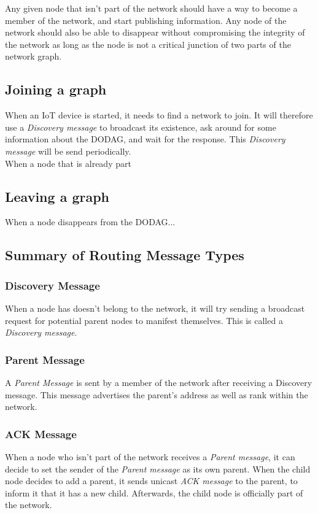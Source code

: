 \documentclass[a4paper,11pt]{article}
\begin{document}
Any given node that isn't part of the network should have a way to become a member of the network, and start publishing information. Any node of the network should also be able to disappear without compromising the integrity of the network as long as the node is not a critical junction of two parts of the network graph.

\subsection{Joining a graph}
When an IoT device is started, it needs to find a network to join. It will therefore use a \textit{Discovery message} to broadcast its existence, ask around for some information about the DODAG, and wait for the response. This \textit{Discovery message} will be send periodically.\\

When a node that is already part

\subsection{Leaving a graph}
When a node disappears from the DODAG...


\subsection{Summary of Routing Message Types}
\subsubsection{Discovery Message}
When a node has doesn't belong to the network, it will try sending a broadcast request for potential parent nodes to manifest themselves. This is called a \textit{Discovery message}.

\subsubsection{Parent Message}
A \textit{Parent Message} is sent by a member of the network after receiving a Discovery message. This message advertises the parent's address as well as rank within the network.

\subsubsection{ACK Message}
When a node who isn't part of the network receives a \textit{Parent message}, it can decide to set the sender of the \textit{Parent message} as its own parent. When the child node decides to add a parent, it sends unicast \textit{ACK message} to the parent, to inform it that it has a new child. Afterwards, the child node is officially part of the network.
\end{document}
